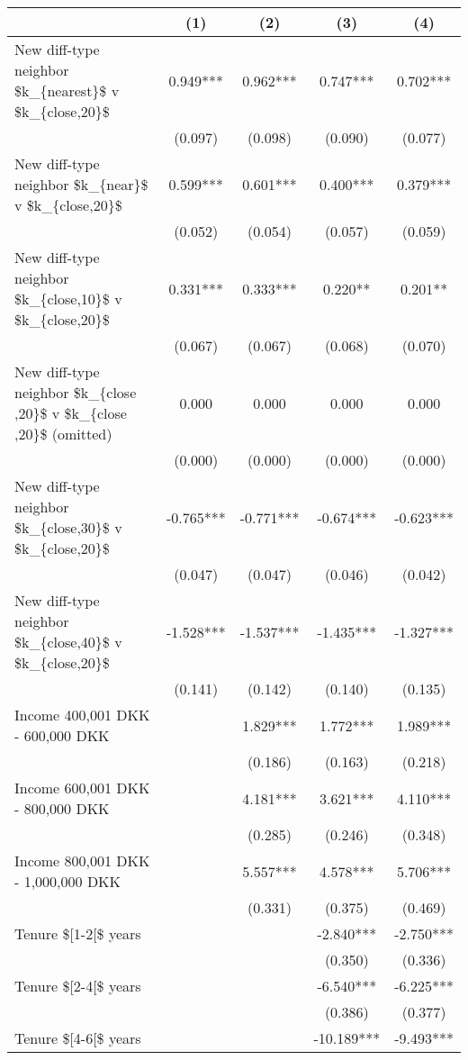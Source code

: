 \setlength{\LTpost}{0mm}
\begin{longtable}{lcccc}
\toprule
  & (1) & (2) & (3) & (4) \\ 
\midrule
New diff-type neighbor \$k\_\{nearest\}\$ v \$k\_\{close,20\}\$ & 0.949*** & 0.962*** & 0.747*** & 0.702*** \\ 
 & (0.097) & (0.098) & (0.090) & (0.077) \\ 
New diff-type neighbor \$k\_\{near\}\$ v \$k\_\{close,20\}\$ & 0.599*** & 0.601*** & 0.400*** & 0.379*** \\ 
 & (0.052) & (0.054) & (0.057) & (0.059) \\ 
New diff-type neighbor \$k\_\{close,10\}\$ v \$k\_\{close,20\}\$ & 0.331*** & 0.333*** & 0.220** & 0.201** \\ 
 & (0.067) & (0.067) & (0.068) & (0.070) \\ 
New diff-type neighbor \$k\_\{close ,20\}\$ v \$k\_\{close ,20\}\$ (omitted) & 0.000 & 0.000 & 0.000 & 0.000 \\ 
 & (0.000) & (0.000) & (0.000) & (0.000) \\ 
New diff-type neighbor \$k\_\{close,30\}\$ v \$k\_\{close,20\}\$ & -0.765*** & -0.771*** & -0.674*** & -0.623*** \\ 
 & (0.047) & (0.047) & (0.046) & (0.042) \\ 
New diff-type neighbor \$k\_\{close,40\}\$ v \$k\_\{close,20\}\$ & -1.528*** & -1.537*** & -1.435*** & -1.327*** \\ 
 & (0.141) & (0.142) & (0.140) & (0.135) \\ 
Income 400,001 DKK - 600,000 DKK &  & 1.829*** & 1.772*** & 1.989*** \\ 
 &  & (0.186) & (0.163) & (0.218) \\ 
Income 600,001 DKK - 800,000 DKK &  & 4.181*** & 3.621*** & 4.110*** \\ 
 &  & (0.285) & (0.246) & (0.348) \\ 
Income 800,001 DKK - 1,000,000 DKK &  & 5.557*** & 4.578*** & 5.706*** \\ 
 &  & (0.331) & (0.375) & (0.469) \\ 
Tenure \$[1-2[\$ years &  &  & -2.840*** & -2.750*** \\ 
 &  &  & (0.350) & (0.336) \\ 
Tenure \$[2-4[\$ years &  &  & -6.540*** & -6.225*** \\ 
 &  &  & (0.386) & (0.377) \\ 
Tenure \$[4-6[\$ years &  &  & -10.189*** & -9.493*** \\ 

\end{longtable}
